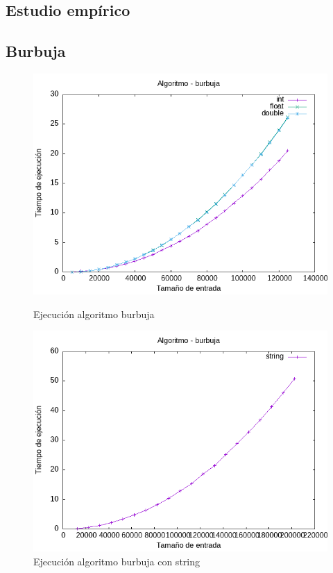 \documentclass[11pt]{article}
\begin{document}
\subsection{Estudio empírico}
\subsection*{Burbuja}
\begin{figure}[H]
    \begin{minipage}{0.5\textwidth}
        \centering
        \includegraphics[width=\linewidth]{assets/Img/burbuja.png}
        \caption{Ejecución algoritmo burbuja}
        \label{fig:burbuja}
    \end{minipage}%
    \begin{minipage}{0.5\textwidth}
        \centering
        \includegraphics[width=\linewidth]{assets/Img/burbujastring.png}
        \caption{Ejecución algoritmo burbuja con string}
        \label{fig:burbujastring}
    \end{minipage}
\end{figure}
\end{document}
